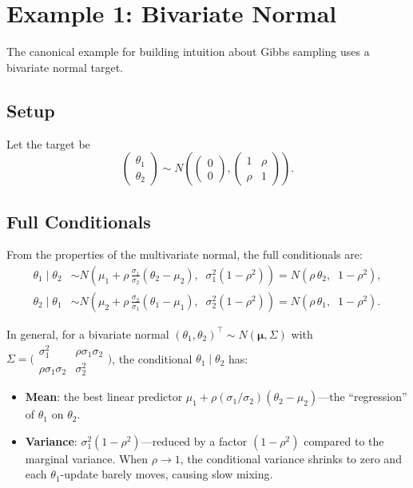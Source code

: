 \documentclass[11pt]{article}
\begin{document}
\section{Example 1: Bivariate Normal}

The canonical example for building intuition about Gibbs sampling uses a bivariate normal target.

\subsection{Setup}

Let the target be
\[
  \begin{pmatrix} \theta_1 \\ \theta_2 \end{pmatrix}
  \sim N\!\left(
    \begin{pmatrix} 0 \\ 0 \end{pmatrix},
    \begin{pmatrix} 1 & \rho \\ \rho & 1 \end{pmatrix}
  \right).
\]

\subsection{Full Conditionals}

From the properties of the multivariate normal, the full conditionals are:
\begin{align}
  \theta_1 \mid \theta_2 &\sim N\!\left(\mu_1 + \rho\,\frac{\sigma_1}{\sigma_2}(\theta_2 - \mu_2), \;\; \sigma_1^2(1 - \rho^2)\right) = N(\rho\,\theta_2, \;\; 1 - \rho^2), \label{eq:cond1} \\[4pt]
  \theta_2 \mid \theta_1 &\sim N\!\left(\mu_2 + \rho\,\frac{\sigma_2}{\sigma_1}(\theta_1 - \mu_1), \;\; \sigma_2^2(1 - \rho^2)\right) = N(\rho\,\theta_1, \;\; 1 - \rho^2). \label{eq:cond2}
\end{align}

In general, for a bivariate normal $(\theta_1, \theta_2)^\top \sim N(\boldsymbol{\mu}, \Sigma)$ with $\Sigma = \bigl(\begin{smallmatrix} \sigma_1^2 & \rho\sigma_1\sigma_2 \\ \rho\sigma_1\sigma_2 & \sigma_2^2 \end{smallmatrix}\bigr)$, the conditional $\theta_1 \mid \theta_2$ has:
\begin{itemize}
  \item \textbf{Mean}: the best linear predictor $\mu_1 + \rho(\sigma_1/\sigma_2)(\theta_2 - \mu_2)$---the ``regression'' of $\theta_1$ on $\theta_2$.
  \item \textbf{Variance}: $\sigma_1^2(1-\rho^2)$---reduced by a factor $(1-\rho^2)$ compared to the marginal variance.  When $\rho \to 1$, the conditional variance shrinks to zero and each $\theta_1$-update barely moves, causing slow mixing.
\end{itemize}
\end{document}
